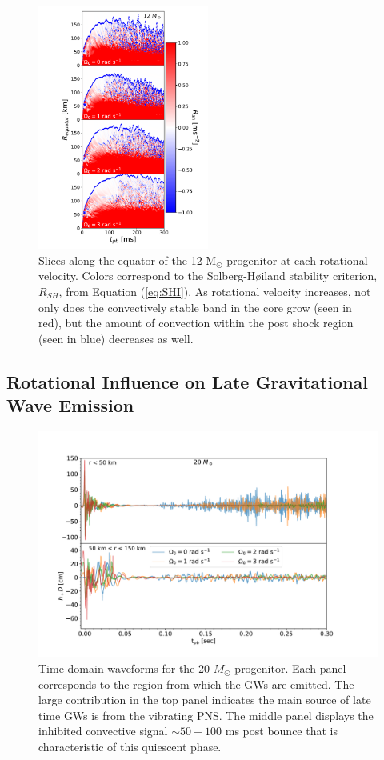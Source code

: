 \documentclass[twocolumn,times]{aastex62}  %
\newcommand{\Msun}{\ensuremath{\mathrm{M}_\odot}\xspace}
\begin{document}
\begin{figure}[ht!]
    \centering
    \includegraphics[width=0.5\textwidth]{figures/SHI_panel.pdf}
    \caption{Slices along the equator of the 12 \Msun progenitor at each rotational velocity.  Colors correspond to the Solberg-H{\o}iland stability criterion, $R_{SH}$, from Equation (\ref{eq:SHI}).  As rotational velocity increases, not only does the convectively stable band in the core grow (seen in red), but the amount of convection within the post shock region (seen in blue) decreases as well. }
    \label{fig:SHI}
\end{figure}

\subsection{Rotational Influence on Late Gravitational Wave Emission}

\begin{figure}[htp]
  \centering     %
  \includegraphics[width=\textwidth]{figures/tdwf_region_20.pdf}
  \caption{Time domain waveforms for the 20 $M_\odot$ progenitor.  Each panel corresponds to the region from which the GWs are emitted.  The large contribution in the top panel indicates the main source of late time GWs is from the vibrating PNS.  The middle panel displays the inhibited convective signal $\sim 50-100 $ ms post bounce that is characteristic of this quiescent phase.}
  \label{fig:region}
\end{figure}
\end{document}
